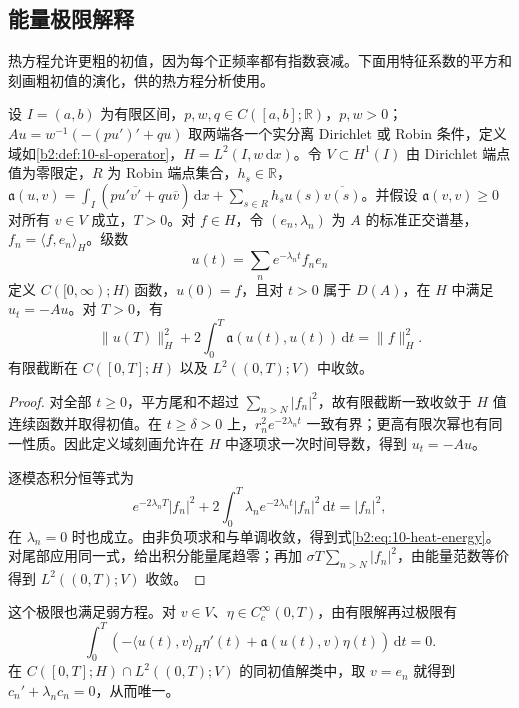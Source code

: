 \subsection{能量极限解释}
\label{b2:subsec:100403}

热方程允许更粗的初值，因为每个正频率都有指数衰减。下面用特征系数的平方和刻画粗初值的演化，供的热方程分析使用。

\begin{proposition}[热方程的平方能量极限]\label{b2:prop:10-heat-energy-limit}
设 \(I=(a,b)\) 为有限区间，\(p,w,q\in C([a,b];\mathbb R)\)，\(p,w>0\)；\(Au=w^{-1}(-(pu')'+qu)\) 取两端各一个实分离 Dirichlet 或 Robin 条件，定义域如\cref{b2:def:10-sl-operator}，\(H=L^2(I,w\,\mathrm dx)\)。令 \(V\subset H^1(I)\) 由 Dirichlet 端点值为零限定，\(R\) 为 Robin 端点集合，\(h_s\in\mathbb R\)，\(\mathfrak a(u,v)=\int_I(pu'\overline{v'}+qu\overline v)\,\mathrm dx+\sum_{s\in R}h_su(s)\overline{v(s)}\)。并假设 \(\mathfrak a(v,v)\geq0\) 对所有 \(v\in V\) 成立，\(T>0\)。对 \(f\in H\)，令 \((e_n,\lambda_n)\) 为 \(A\) 的标准正交谱基，\(f_n=\langle f,e_n\rangle_H\)。级数
\[
 u(t)=\sum_ne^{-\lambda_nt}f_ne_n
\]
定义 \(C([0,\infty);H)\) 函数，\(u(0)=f\)，且对 \(t>0\) 属于 \(D(A)\)，在 \(H\) 中满足 \(u_t=-Au\)。对 \(T>0\)，有
\begin{equation}\label{b2:eq:10-heat-energy}
 \|u(T)\|_H^2+2\int_0^T\mathfrak a(u(t),u(t))\,\mathrm{d}t
 =\|f\|_H^2.
\end{equation}
有限截断在 \(C([0,T];H)\) 以及 \(L^2((0,T);V)\) 中收敛。
\end{proposition}
\begin{proof}
对全部 \(t\geq0\)，平方尾和不超过 \(\sum_{n>N}|f_n|^2\)，故有限截断一致收敛于 \(H\) 值连续函数并取得初值。在 \(t\geq\delta>0\) 上，\(r_n^2e^{-2\lambda_nt}\) 一致有界；更高有限次幂也有同一性质。因此定义域刻画允许在 \(H\) 中逐项求一次时间导数，得到 \(u_t=-Au\)。

逐模态积分恒等式为
\[
 e^{-2\lambda_nT}|f_n|^2
 +2\int_0^T\lambda_ne^{-2\lambda_nt}|f_n|^2\,\mathrm{d}t
 =|f_n|^2,
\]
在 \(\lambda_n=0\) 时也成立。由非负项求和与单调收敛，得到式\eqref{b2:eq:10-heat-energy}。对尾部应用同一式，给出积分能量尾趋零；再加 \(\sigma T\sum_{n>N}|f_n|^2\)，由能量范数等价得到 \(L^2((0,T);V)\) 收敛。
\end{proof}

这个极限也满足弱方程。对 \(v\in V\)、\(\eta\in C_c^\infty(0,T)\)，由有限解再过极限有
\[
 \int_0^T\left(-\langle u(t),v\rangle_H\eta'(t)
 +\mathfrak a(u(t),v)\eta(t)\right)\,\mathrm{d}t=0.
\]
在 \(C([0,T];H)\cap L^2((0,T);V)\) 的同初值解类中，取 \(v=e_n\) 就得到 \(c_n'+\lambda_nc_n=0\)，从而唯一。

